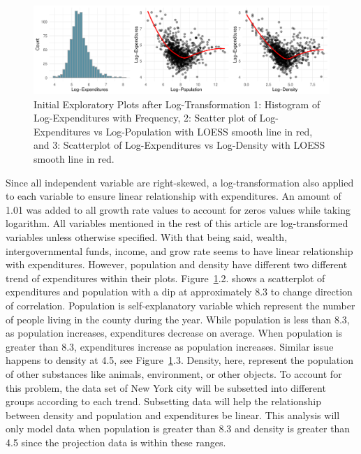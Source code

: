 \documentclass[11pt]{article}\usepackage[]{graphicx}\usepackage[]{color}
\makeatletter
\def\maxwidth{ %
  \ifdim\Gin@nat@width>\linewidth
    \linewidth
  \else
    \Gin@nat@width
  \fi
}
\makeatother
\begin{document}
\begin{figure}[h!] 
\begin{center}

\includegraphics[width=\maxwidth]{figure/unnamed-chunk-1-1} 

\caption{Initial Exploratory Plots after Log-Transformation 1: Histogram of Log-Expenditures with Frequency, 2: Scatter plot of Log-Expenditures vs Log-Population with LOESS smooth line in red, and 3: Scatterplot of Log-Expenditures vs Log-Density with LOESS smooth line in red.}
\label{inital-explore}
\end{center} 
\end{figure}

\noindent Since all independent variable are right-skewed, a log-transformation also applied to each variable to ensure linear relationship with expenditures. An amount of 1.01 was added to all growth rate values to account for zeros values while taking logarithm. All variables mentioned in the rest of this article are log-transformed variables unless otherwise specified. With that being said, wealth, intergovernmental funds, income, and grow rate seems to have linear relationship with expenditures. However, population and density have different two different trend of expenditures within their plots. Figure~\ref{inital-explore}.2. shows a scatterplot of expenditures and population with a dip at approximately 8.3 to change direction of correlation. Population is self-explanatory variable which represent the number of people living in the county during the year. While population is less than 8.3, as population increases, expenditures decrease on average. When population is greater than 8.3, expenditures increase as population increases. Similar issue happens to density at 4.5, see Figure~\ref{inital-explore}.3. Density, here, represent the population of other substances like animals, environment, or other objects. To account for this problem, the data set of New York city will be subsetted into different groups according to each trend. Subsetting data will help the relationship between density and population and expenditures be linear. This analysis will only model data when population is greater than 8.3 and density is greater than 4.5 since the projection data is within these ranges.    
\hfill \break
\end{document}
